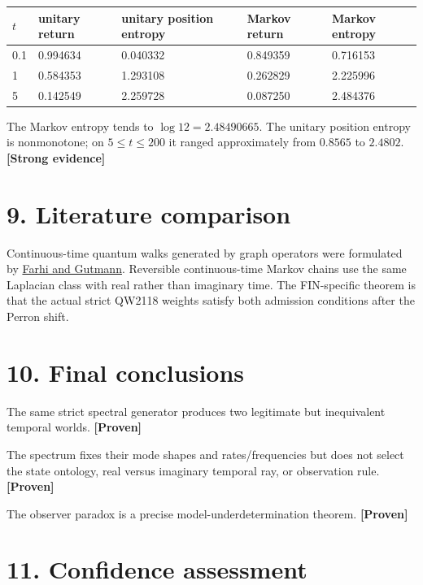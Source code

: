 \documentclass[11pt,a4paper,openany]{report}
\newcommand{\statusProven}{\textcolor{fingreen}{[Proven]}}
\newcommand{\statusStrong}{\textcolor{finblue}{[Strong evidence]}}
\begin{document}
\begin{center}
\begingroup\footnotesize
\setlength{\tabcolsep}{3.5pt}
\renewcommand{\arraystretch}{1.16}
\begin{longtable}{@{}p{}p{}p{}p{}p{}@{}}
\toprule
\textbf{\(t\)} & \textbf{unitary return} & \textbf{unitary position entropy} & \textbf{Markov return} & \textbf{Markov entropy} \\
\midrule
\endhead
0.1 & 0.994634 & 0.040332 & 0.849359 & 0.716153 \\
1 & 0.584353 & 1.293108 & 0.262829 & 2.225996 \\
5 & 0.142549 & 2.259728 & 0.087250 & 2.484376 \\
\bottomrule
\end{longtable}
\endgroup
\end{center}

The Markov entropy tends to \(\log12=2.48490665\). The unitary position entropy is nonmonotone; on \(5\le t\le200\) it ranged approximately from \(0.8565\) to \(2.4802\). \textbf{\statusStrong{}}

\section{9. Literature comparison}

Continuous-time quantum walks generated by graph operators were formulated by \href{https://arxiv.org/abs/quant-ph/9706062}{Farhi and Gutmann}. Reversible continuous-time Markov chains use the same Laplacian class with real rather than imaginary time. The FIN-specific theorem is that the actual strict QW2118 weights satisfy both admission conditions after the Perron shift.

\section{10. Final conclusions}

The same strict spectral generator produces two legitimate but inequivalent temporal worlds. \textbf{\statusProven{}}

The spectrum fixes their mode shapes and rates/\allowbreak{}frequencies but does not select the state ontology, real versus imaginary temporal ray, or observation rule. \textbf{\statusProven{}}

The observer paradox is a precise model-underdetermination theorem. \textbf{\statusProven{}}

\section{11. Confidence assessment}
\end{document}
